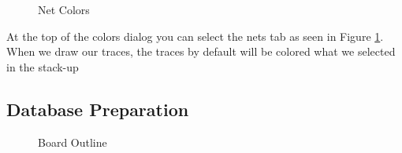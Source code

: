 \begin{figure}[H]
  \centering
\caption{Net Colors}
\label{img:netColors}
\end{figure}

At the top of the colors dialog you can select the nets tab as seen in Figure \ref{img:netColors}. When we draw our traces,
the traces by default will be colored what we selected in the stack-up 

\subsection*{Database Preparation}

\begin{figure}[H]
  \centering
\caption{Board Outline}
\label{img:boardoutline}
\end{figure}

